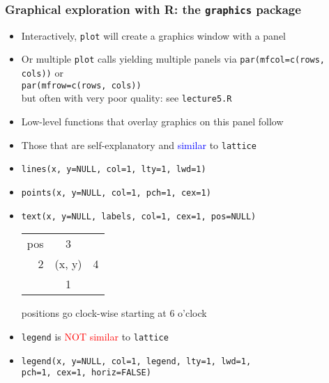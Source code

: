 \documentclass[11pt,pdftex,dvipsnames,usenames,helvetica]{beamer}
\begin{document}
\begin{frame}[fragile]
\frametitle{Graphical exploration with R: the {\tt graphics} package}
\begin{itemize}
\item Interactively, {\tt plot} will create a graphics window with a panel
\item Or multiple {\tt plot} calls yielding multiple 
panels via {\tt par(mfcol=c(rows, cols))} or\\
 {\tt par(mfrow=c(rows, cols))}\\
but often with very poor quality: see {\tt lecture5.R}
\item Low-level functions that overlay graphics on this panel follow
\item Those that are self-explanatory and
\textcolor{blue}{similar} to {\tt lattice}
\item {\tt lines(x, y=NULL, col=1, lty=1, lwd=1)} 
\item {\tt points(x, y=NULL, col=1, pch=1, cex=1)} 
\item {\tt text(x, y=NULL, labels, col=1, cex=1, pos=NULL)} \\
\begin{tabular}{rcc}
\multicolumn{1}{l}{pos} & 3 &  \\
2   & (x, y) & 4 \\
    & 1 \\
\end{tabular} positions go clock-wise starting at 6 o'clock
\item {\tt legend} is \textcolor{red}{NOT similar} to {\tt lattice} 
\item {\tt legend(x, y=NULL, col=1, legend, lty=1, lwd=1,\\ 
\quad pch=1, cex=1, horiz=FALSE)}
\end{itemize}
\end{frame}
\end{document}
